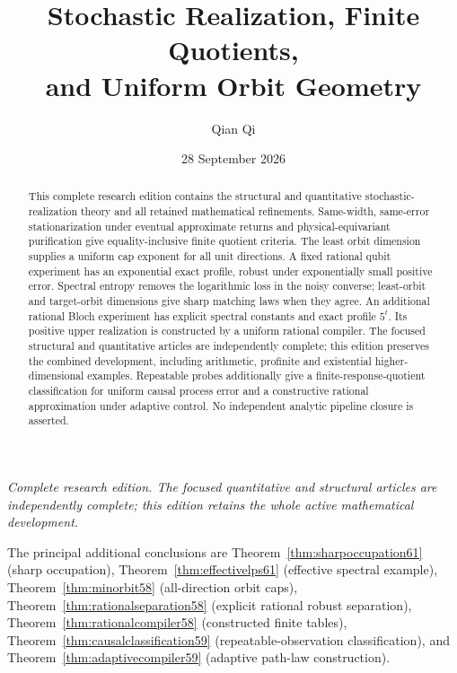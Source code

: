 \documentclass[11pt]{amsart}
\title[Stochastic realization and orbit geometry]{Stochastic Realization, Finite Quotients,\\and Uniform Orbit Geometry}
\author{Qian Qi}
\date{28 September 2026}
\numberwithin{equation}{section}
\theoremstyle{definition}\newtheorem{definition}[theorem]{Definition}
\theoremstyle{remark}\newtheorem{remark}[theorem]{Remark}
\begin{document}
\begin{abstract}
This complete research edition contains the structural and quantitative
stochastic-realization theory and all retained mathematical refinements.
Same-width, same-error stationarization under eventual approximate returns
and physical-equivariant purification give equality-inclusive finite
quotient criteria. The least orbit dimension supplies a uniform cap
exponent for all unit directions. A fixed rational qubit experiment has
an exponential exact profile, robust under exponentially small positive
error. Spectral entropy removes the logarithmic loss in the noisy
converse; least-orbit and target-orbit dimensions give sharp matching
laws when they agree. An additional rational Bloch experiment has
explicit spectral constants and exact profile $5^t$. Its positive upper realization is constructed by a uniform
rational compiler. The focused structural and quantitative articles are
independently complete; this edition preserves the combined development,
including arithmetic, profinite and existential higher-dimensional
examples. Repeatable probes additionally give a finite-response-quotient
classification for uniform causal process error and a constructive
rational approximation under adaptive control. No independent analytic
pipeline closure is asserted.
\end{abstract}
\maketitle
\noindent\textit{Complete research edition. The focused quantitative and structural articles are independently complete; this edition retains the whole active mathematical development.}

\noindent The principal additional conclusions are
Theorem~\ref{thm:sharpoccupation61} (sharp occupation),
Theorem~\ref{thm:effectivelps61} (effective spectral example),
Theorem~\ref{thm:minorbit58} (all-direction orbit caps),
Theorem~\ref{thm:rationalseparation58} (explicit rational robust separation),
Theorem~\ref{thm:rationalcompiler58} (constructed finite tables),
Theorem~\ref{thm:causalclassification59} (repeatable-observation
classification), and Theorem~\ref{thm:adaptivecompiler59} (adaptive
path-law construction).


























\appendix


\end{document}
